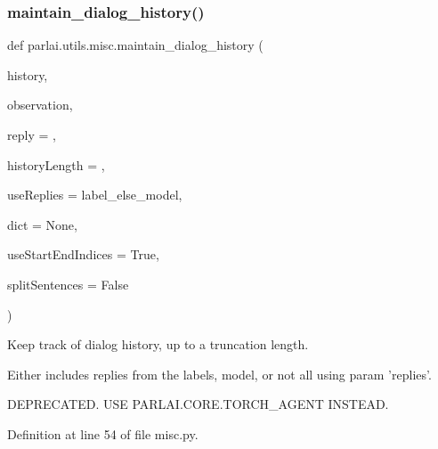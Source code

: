 \subsubsection{\texorpdfstring{maintain\+\_\+dialog\+\_\+history()}{maintain\_dialog\_history()}}
{\footnotesize\ttfamily def parlai.\+utils.\+misc.\+maintain\+\_\+dialog\+\_\+history (\begin{DoxyParamCaption}\item[{}]{history,  }\item[{}]{observation,  }\item[{}]{reply = {\ttfamily \textquotesingle{}\textquotesingle{}},  }\item[{}]{history\+Length = {},  }\item[{}]{use\+Replies = {\ttfamily \textquotesingle{}label\+\_\+else\+\_\+model\textquotesingle{}},  }\item[{}]{dict = {\ttfamily None},  }\item[{}]{use\+Start\+End\+Indices = {\ttfamily True},  }\item[{}]{split\+Sentences = {\ttfamily False} }\end{DoxyParamCaption})}

\begin{DoxyVerb}Keep track of dialog history, up to a truncation length.

Either includes replies from the labels, model, or not all using param
'replies'.

DEPRECATED. USE PARLAI.CORE.TORCH_AGENT INSTEAD.
\end{DoxyVerb}
 

Definition at line 54 of file misc.\+py.


